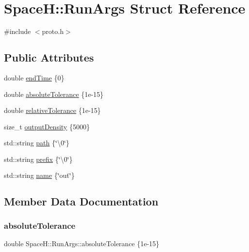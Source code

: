 \hypertarget{struct_space_h_1_1_run_args}{}\section{SpaceH\+:\+:Run\+Args Struct Reference}
\label{struct_space_h_1_1_run_args}


{\ttfamily \#include $<$proto.\+h$>$}

\subsection*{Public Attributes}
\begin{DoxyCompactItemize}
\item 
double \mbox{\hyperlink{struct_space_h_1_1_run_args_adcdd3340b5c7d73eb1f9a29875169b72}{end\+Time}} \{0\}
\item 
double \mbox{\hyperlink{struct_space_h_1_1_run_args_a7e8f5a545046c3a2e0d63cc40247127e}{absolute\+Tolerance}} \{1e-\/15\}
\item 
double \mbox{\hyperlink{struct_space_h_1_1_run_args_a9b9ba1c4d3a78db9da6fa9539fba58cd}{relative\+Tolerance}} \{1e-\/15\}
\item 
size\+\_\+t \mbox{\hyperlink{struct_space_h_1_1_run_args_a2eac04f1970a737d11ac0526576ba98f}{output\+Density}} \{5000\}
\item 
std\+::string \mbox{\hyperlink{struct_space_h_1_1_run_args_abe0393795ac194e24a65dcd3367638d1}{path}} \{\char`\"{}\textbackslash{}0\char`\"{}\}
\item 
std\+::string \mbox{\hyperlink{struct_space_h_1_1_run_args_aeb58d8dff1d50d813ecd2dea9d944cb2}{prefix}} \{\char`\"{}\textbackslash{}0\char`\"{}\}
\item 
std\+::string \mbox{\hyperlink{struct_space_h_1_1_run_args_acb3f7f260c665c9a7af014bcf941cd51}{name}} \{\char`\"{}out\char`\"{}\}
\end{DoxyCompactItemize}


\subsection{Member Data Documentation}
\mbox{\label{struct_space_h_1_1_run_args_a7e8f5a545046c3a2e0d63cc40247127e}} 
\subsubsection{\texorpdfstring{absolute\+Tolerance}{absoluteTolerance}}
{\footnotesize\ttfamily double Space\+H\+::\+Run\+Args\+::absolute\+Tolerance \{1e-\/15\}}

